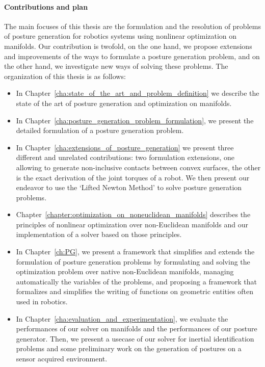 
\paragraph{Contributions and plan}
The main focuses of this thesis are the formulation and the resolution of problems of posture generation for robotics systems using nonlinear optimization on manifolds.
Our contribution is twofold, on the one hand, we propose extensions and improvements of the ways to formulate a posture generation problem, and on the other hand, we investigate new ways of solving these problems.
The organization of this thesis is as follows:
\begin{itemize}
  \item In Chapter~\ref{cha:state_of_the_art_and_problem_definition} we describe the state of the art of posture generation and optimization on manifolds.
  \item In Chapter~\ref{cha:posture_generation_problem_formulation}, we present the detailed formulation of a posture generation problem.
  \item In Chapter~\ref{cha:extensions_of_posture_generation} we present three different and unrelated contributions: two formulation extensions, one allowing to generate non-inclusive contacts between convex surfaces, the other is the exact derivation of the joint torques of a robot.
  We then present our endeavor to use the `Lifted Newton Method' to solve posture generation problems.
  \item Chapter~\ref{chapter:optimization_on_noneuclidean_manifolds} describes the principles of nonlinear optimization over non-Euclidean manifolds and our implementation of a solver based on those principles.
  \item In Chapter~\ref{ch:PG}, we present a framework that simplifies and extends the formulation of posture generation problems by formulating and solving the optimization problem over native non-Euclidean manifolds, managing automatically the variables of the problems, and proposing a framework that formalizes and simplifies the writing of functions on geometric entities often used in robotics.
  \item In Chapter~\ref{cha:evaluation_and_experimentation}, we evaluate the performances of our solver on manifolds and the performances of our posture generator. Then, we present a usecase of our solver for inertial identification problems and some preliminary work on the generation of postures on a sensor acquired environment.
\end{itemize}


